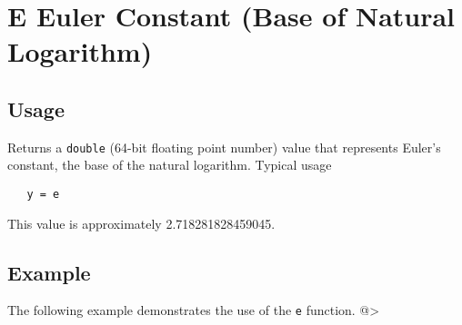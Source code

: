 \section{E Euler Constant (Base of Natural Logarithm)}

\subsection{Usage}

Returns a \verb|double| (64-bit floating point number) value that represents Euler's constant, the base of the natural logarithm.  Typical usage 
\begin{verbatim}
   y = e
\end{verbatim}
This value is approximately 2.718281828459045.
\subsection{Example}

The following example demonstrates the use of the \verb|e| function.
@>

